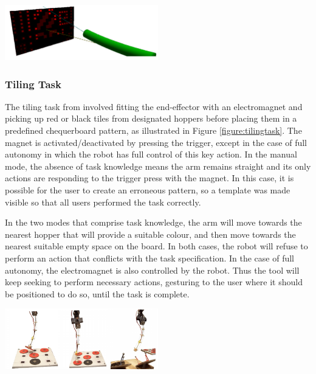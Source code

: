 \documentclass[11pt]{article}
\begin{document}
\begin{center}
\includegraphics[width=0.5\textwidth]{painting.png}
\label{figure:painting}
\end{center}

\subsubsection{Tiling Task}
The tiling task from \cite{GreggSmithDesign} involved fitting the end-effector with an electromagnet and picking up red or black tiles from designated hoppers before placing them in a predefined chequerboard pattern, as illustrated in Figure \ref{figure:tilingtask}. The magnet is activated/deactivated by pressing the trigger, except in the case of full autonomy in which the robot has full control of this key action. In the manual mode, the absence of task knowledge means the arm remains straight and its only actions are responding to the trigger press with the magnet. In this case, it is possible for the user to create an erroneous pattern, so a template was made visible so that all users performed the task correctly. 

In the two modes that comprise task knowledge, the arm will move towards the nearest hopper that will provide a suitable colour, and then move towards the nearest suitable empty space on the board. In both cases, the robot will refuse to perform an action that conflicts with the task specification. In the case of full autonomy, the electromagnet is also controlled by the robot. Thus the tool will keep seeking to perform necessary actions, gesturing to the user where it should be positioned to do so, until the task is complete.

\begin{center}
\includegraphics[width=0.5\textwidth]{tilingtask.png}
\label{figure:tilingtask}
\end{center}
\end{document}
